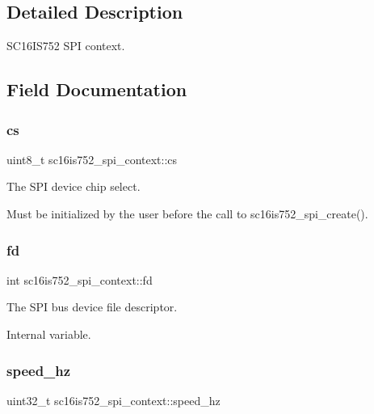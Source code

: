 \subsection{Detailed Description}
S\+C16\+I\+S752 S\+PI context. 

\subsection{Field Documentation}
\mbox{\label{structsc16is752__spi__context_aeaff86716e33a8ed4ac9e99e2683b1c0}} 
\subsubsection{\texorpdfstring{cs}{cs}}
{\footnotesize\ttfamily uint8\+\_\+t sc16is752\+\_\+spi\+\_\+context\+::cs}



The S\+PI device chip select. 

Must be initialized by the user before the call to sc16is752\+\_\+spi\+\_\+create(). \mbox{\label{structsc16is752__spi__context_afa904b50c5cceaf418eaf5c74ca64f79}} 
\subsubsection{\texorpdfstring{fd}{fd}}
{\footnotesize\ttfamily int sc16is752\+\_\+spi\+\_\+context\+::fd}



The S\+PI bus device file descriptor. 

Internal variable. \mbox{\label{structsc16is752__spi__context_a3a8b236916a9afd88fcf66ea32868d27}} 
\subsubsection{\texorpdfstring{speed\_hz}{speed\_hz}}
{\footnotesize\ttfamily uint32\+\_\+t sc16is752\+\_\+spi\+\_\+context\+::speed\+\_\+hz}



